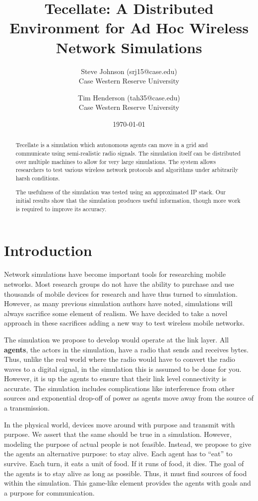 \documentclass[12pt]{article}
\title{Tecellate: A Distributed Environment for Ad Hoc Wireless Network Simulations}
\author{
        Steve Johnson (srj15@case.edu)\\
        Case Western Reserve University\\
        \and Tim Henderson (tah35@case.edu)\\
        Case Western Reserve University
}
\date{\today}
\begin{document}
\doublespacing
\maketitle


\begin{abstract}
    Tecellate is a simulation which autonomous agents can move in a grid and communicate using
    semi-realistic radio signals. The simulation itself can be distributed over multiple machines to
    allow for very large simulations. The system allows researchers to test various wireless network
    protocols and algorithms under arbitrarily harsh conditions.
    
     The usefulness of the simulation was tested using an approximated IP stack. Our initial results
    show that the simulation produces useful information, though more work is required to improve
    its accuracy.
\end{abstract}

\section{Introduction}

Network simulations have become important tools for researching mobile networks. Most research
groups do not have the ability to purchase and use thousands of mobile devices for research and have
thus turned to simulation. However, as many previous simulation authors have noted, simulations will
always sacrifice some element of realism. We have decided to take a novel approach in these
sacrifices adding a new way to test wireless mobile networks.

The simulation we propose to develop would operate at the link layer. All \textbf{agents}, the
actors in the simulation, have a radio that sends and receives bytes. Thus, unlike the real world
where the radio would have to convert the radio waves to a digital signal, in the simulation this is
assumed to be done for you. However, it is up the agents to ensure that their link level
connectivity is accurate. The simulation includes complications like interference from other sources
and exponential drop-off of power as agents move away from the source of a transmission.

In the physical world, devices move around with purpose and transmit with purpose. We assert that
the same should be true in a simulation. However, modeling the purpose of actual people is not
feasible. Instead, we propose to give the agents an alternative purpose: to stay alive. Each agent
has to ``eat'' to survive. Each turn, it eats a unit of food. If it runs of food, it dies. The goal
of the agents is to stay alive as long as possible. Thus, it must find sources of food within the
simulation. This game-like element provides the agents with goals and a purpose for communication.
\end{document}
